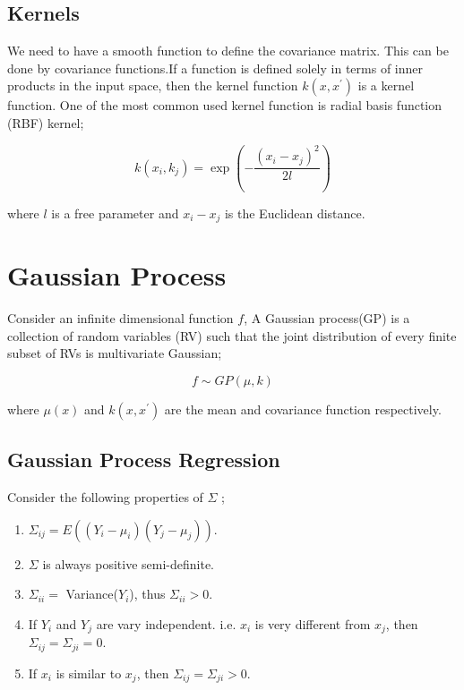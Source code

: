 \documentclass{article}
\begin{document}
\subsection{Kernels}

We need to have a smooth function to define the covariance matrix. This can be done by covariance functions.If a function is defined solely in terms of inner products in the input space, then the kernel function $k(x, x^{\prime})$ is a kernel function. One of the most common used kernel function is radial basis function (RBF) kernel;

\begin{equation}
k(x_{i}, k_{j}) = \exp(-\frac{(x_{i} - x_{j})^{2}}{2l})
\end{equation}

where $l$ is a free parameter and $x_{i} - x_{j}$ is the Euclidean distance.


\section{Gaussian Process}

Consider an infinite dimensional function $f$, A Gaussian process(GP) is a collection of random variables (RV) such that the joint distribution of every finite subset of RVs is multivariate Gaussian;

\begin{equation}
f \sim GP(\mu, k)
\end{equation}

where $\mu(x)$ and $k(x, x^{\prime})$ are the mean and covariance function respectively.

\subsection{Gaussian Process Regression}

Consider the following properties of $\Sigma$ \cite{wang2020intuitive};

\begin{enumerate}
\item $\Sigma_{ij} = E((Y_{i} - \mu_{i})(Y_{j} - \mu_{j}))$.
\item $\Sigma$ is always positive semi-definite.
\item $\Sigma_{ii} =$ Variance($Y_{i}$), thus $\Sigma_{ii} > 0$.
\item If $Y_{i}$ and $Y_{j}$ are vary independent. i.e. $x_{i}$ is very different from $x_{j}$, then $\Sigma_{ij} = \Sigma_{ji} = 0$.
\item If $x_{i}$ is similar to $x_{j}$, then $\Sigma_{ij} = \Sigma_{ji} > 0$.
\end{enumerate}
\end{document}
